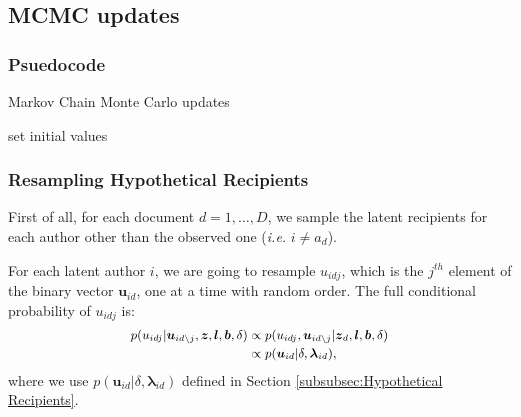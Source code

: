 \documentclass[twoside]{article}
\begin{document}
  	 \subsection{MCMC updates}\label{subsec:Sampling Equations}
  	  	  \subsubsection{Psuedocode} \label{subsubsec: Pseudocode}
  	  \begin{algorithm}[H]
  	  	\footnotesize
  	  	\SetAlgoLined
  	  	\caption{Markov Chain Monte Carlo updates}
  	  	set initial values\\
  	  	\label{alg:Infernece}
  	  \end{algorithm}
  	  
  	  \subsubsection{Resampling Hypothetical Recipients} \label{subsubsec: Resampling Hypothetical Recipients}
  	  First of all, for each document $d=1,\ldots, D$, we sample the latent recipients for each author other than the observed one (\textit{i.e.} $i \neq a_d$). 
  	  
  	  For each latent author $i$, we are going to resample $u_{idj}$, which is the $j^{th}$ element of the binary vector $\boldsymbol{u}_{id}$, one at a time with random order. The full conditional probability of $u_{idj}$ is:
  	  \begin{equation*}
  	    	 \footnotesize
  	  \begin{aligned}
  	  p(u_{idj}|\boldsymbol{u}_{id\backslash j},  \boldsymbol{z},\boldsymbol{l},\boldsymbol{b}, \delta)&\propto p(u_{idj}, \boldsymbol{u}_{id\backslash j}|\boldsymbol{z}_d,\boldsymbol{l},\boldsymbol{b}, \delta)
  	  \\&\propto p(\boldsymbol{u}_{id}|\delta, \boldsymbol{\lambda}_{id}),
  	  \end{aligned}
  	  \label{eqn:latentreceiver}
  	  \end{equation*}
  	  where we use $p(\boldsymbol{u}_{id}|\delta, \boldsymbol{\lambda}_{id})$ defined in Section \ref{subsubsec:Hypothetical Recipients}.
  	  
\end{document}
